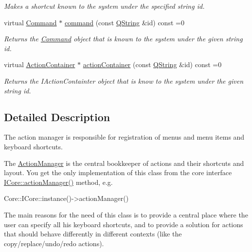 \begin{DoxyCompactItemize}
\begin{DoxyCompactList}\small\item\em \-Makes a {\itshape shortcut\/} known to the system under the specified string {\itshape id\/}. \end{DoxyCompactList}\item 
virtual \hyperlink{class_core_1_1_command}{\-Command} $\ast$ \hyperlink{group___core_plugin_ga262e29bf6a8d1cf1fb92dfe93b96621e}{command} (const \hyperlink{group___u_a_v_objects_plugin_gab9d252f49c333c94a72f97ce3105a32d}{\-Q\-String} \&id) const =0
\begin{DoxyCompactList}\small\item\em \-Returns the \hyperlink{class_core_1_1_command}{\-Command} object that is known to the system under the given string {\itshape id\/}. \end{DoxyCompactList}\item 
virtual \hyperlink{class_core_1_1_action_container}{\-Action\-Container} $\ast$ \hyperlink{group___core_plugin_ga0bd5e0ad7658056a7c80666200734df8}{action\-Container} (const \hyperlink{group___u_a_v_objects_plugin_gab9d252f49c333c94a72f97ce3105a32d}{\-Q\-String} \&id) const =0
\begin{DoxyCompactList}\small\item\em \-Returns the \-I\-Action\-Containter object that is know to the system under the given string {\itshape id\/}. \end{DoxyCompactList}\end{DoxyCompactItemize}


\subsection{\-Detailed \-Description}
\-The action manager is responsible for registration of menus and menu items and keyboard shortcuts. 

\-The \hyperlink{class_core_1_1_action_manager}{\-Action\-Manager} is the central bookkeeper of actions and their shortcuts and layout. \-You get the only implementation of this class from the core interface \hyperlink{group___core_plugin_ga5e44e7795213bb2627acfa08a13f6a12}{\-I\-Core\-::action\-Manager()} method, e.\-g. 
\begin{DoxyCode}
        Core::ICore::instance()->actionManager()
\end{DoxyCode}


\-The main reasons for the need of this class is to provide a central place where the user can specify all his keyboard shortcuts, and to provide a solution for actions that should behave differently in different contexts (like the copy/replace/undo/redo actions).

